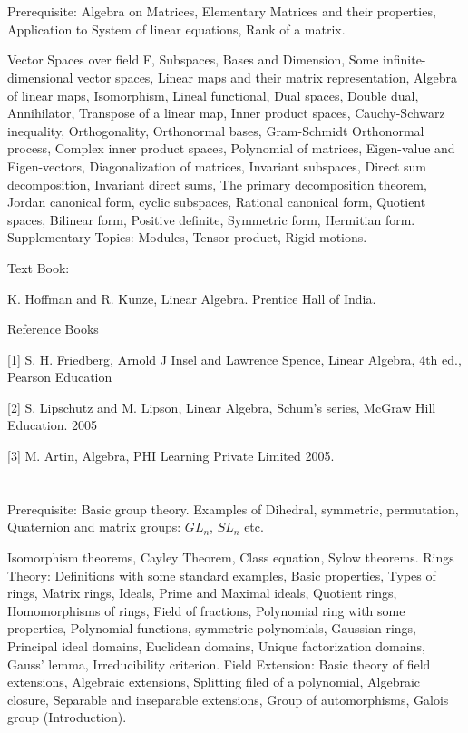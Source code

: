 \section{\courseinfo}

Prerequisite: Algebra on Matrices, Elementary Matrices and their properties, Application to System of linear equations, Rank of a matrix.

Vector Spaces over field F, Subspaces, Bases and Dimension, Some infinite-dimensional vector spaces, Linear maps and their matrix representation, Algebra of linear maps, Isomorphism, Lineal functional, Dual spaces, Double dual, Annihilator, Transpose of a linear map, Inner product spaces, Cauchy-Schwarz inequality, Orthogonality, Orthonormal bases, Gram-Schmidt Orthonormal process, Complex inner product spaces, Polynomial of matrices, Eigen-value and Eigen-vectors, Diagonalization of matrices, Invariant subspaces, Direct sum decomposition, Invariant direct sums, The primary decomposition theorem, Jordan canonical form, cyclic subspaces, Rational canonical form, Quotient spaces, Bilinear form, Positive definite, Symmetric form, Hermitian form.
Supplementary Topics: Modules, Tensor product, Rigid motions.

Text Book: 

K. Hoffman and R. Kunze, Linear Algebra. Prentice Hall of India.

Reference Books

[1] S. H. Friedberg, Arnold J Insel and Lawrence Spence, Linear Algebra, 4th ed., Pearson Education

[2] S. Lipschutz and M. Lipson, Linear Algebra, Schum’s series, McGraw Hill Education. 2005

[3] M. Artin, Algebra, PHI Learning Private Limited 2005.

\section{\courseinfo}

Prerequisite: Basic group theory. Examples of Dihedral, symmetric, permutation, Quaternion and matrix groups:  $GL_n$, $SL_n$ etc. 

Isomorphism theorems, Cayley Theorem, Class equation, Sylow theorems. Rings Theory: Definitions with some standard examples, Basic properties, Types of rings, Matrix rings, Ideals, Prime and Maximal ideals, Quotient rings, Homomorphisms of rings, Field of fractions, Polynomial ring with some properties, Polynomial functions, symmetric polynomials, Gaussian rings, Principal ideal domains, Euclidean domains, Unique factorization domains, Gauss’ lemma, Irreducibility criterion. Field Extension: Basic theory of field extensions, Algebraic extensions, Splitting filed of a polynomial, Algebraic closure, Separable and inseparable extensions, Group of automorphisms, Galois group (Introduction). 

